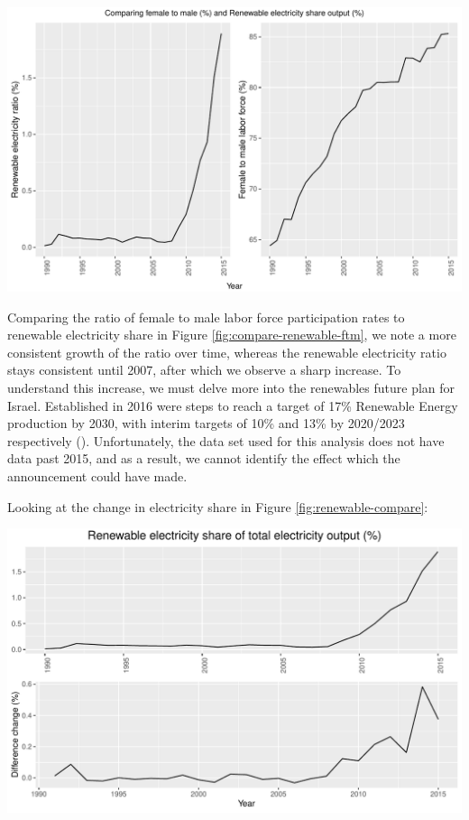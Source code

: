 \documentclass[11pt,a4paper,]{article}
\let\origfigure\figure
\let\endorigfigure\endfigure
\renewenvironment{figure}[1][2] {
    \expandafter\origfigure\expandafter[H]
} {
    \endorigfigure
}%
\begin{document}
\begin{figure}
\centering
\includegraphics{report_files/figure-latex/compare-renewable-ftm-1.pdf}
\caption{\label{fig:compare-renewable-ftm}Comparing female to male ratio to
renewable electricity output share}
\end{figure}

Comparing the ratio of female to male labor force participation rates to
renewable electricity share in Figure \ref{fig:compare-renewable-ftm},
we note a more consistent growth of the ratio over time, whereas the
renewable electricity ratio stays consistent until 2007, after which we
observe a sharp increase. To understand this increase, we must delve
more into the renewables future plan for Israel. Established in 2016
were steps to reach a target of 17\% Renewable Energy production by
2030, with interim targets of 10\% and 13\% by 2020/2023 respectively
(\textcite{IEA2019}). Unfortunately, the data set used for this analysis
does not have data past 2015, and as a result, we cannot identify the
effect which the announcement could have made.

Looking at the change in electricity share in Figure
\ref{fig:renewable-compare}:

\begin{figure}
\centering
\includegraphics{report_files/figure-latex/renewable-compare-1.pdf}
\caption{\label{fig:renewable-compare}Looking at Renewable electricity
share, and difference change}
\end{figure}
\end{document}
